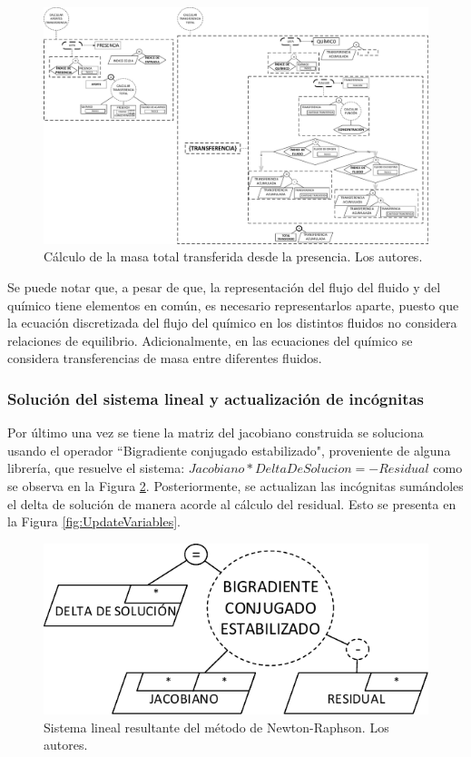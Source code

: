 \begin{figure}[h]
	\centering%
	\includegraphics[width=0.9\linewidth]{Fig/CalcularTransferencias.pdf}%
	\caption[Cálculo de la masa total transferida desde la presencia.]{Cálculo de la masa total transferida desde la presencia. Los autores.} \label{fig:ChemicalTransferences}
\end{figure}

Se puede notar que, a pesar de que, la representación del flujo del fluido y del químico tiene elementos en común, es necesario representarlos aparte, puesto que la ecuación discretizada del flujo del químico en los distintos fluidos no considera relaciones de equilibrio. Adicionalmente, en las ecuaciones del químico se considera transferencias de masa entre diferentes fluidos.

\subsubsection{Solución del sistema lineal y actualización de incógnitas}
Por último una vez se tiene la matriz del jacobiano construida se soluciona usando el operador ``Bigradiente conjugado estabilizado", proveniente de alguna librería, que resuelve el sistema: $Jacobiano*DeltaDeSolucion = -Residual$ como se observa en la Figura \ref{fig:LinearSystem}. Posteriormente, se actualizan las incógnitas sumándoles el delta de solución de manera acorde al cálculo del residual. Esto se presenta en la Figura \ref{fig:UpdateVariables}.

\begin{figure}[h]
	\centering%
	\includegraphics[scale=1]{Fig/SistemaLineal.pdf}%
	\caption[Sistema lineal resultante del método de Newton-Raphson.]{Sistema lineal resultante del método de Newton-Raphson. Los autores.} \label{fig:LinearSystem}
\end{figure}

